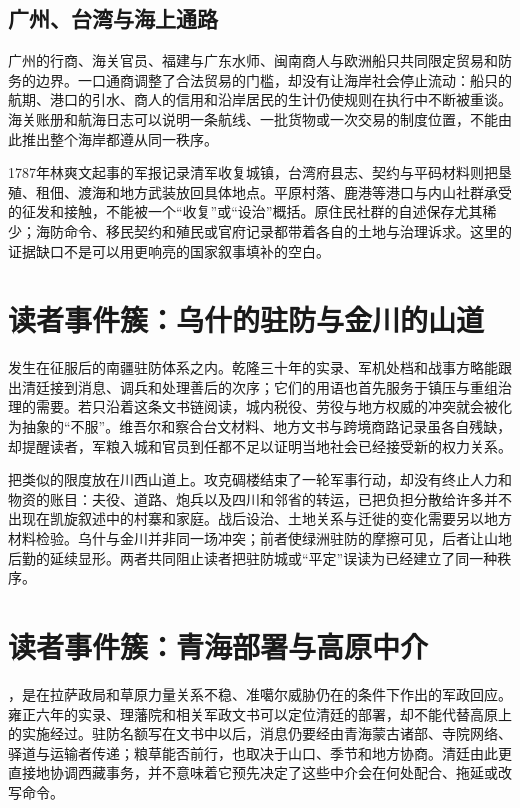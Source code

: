 \subsection{广州、台湾与海上通路}

广州的行商、海关官员、福建与广东水师、闽南商人与欧洲船只共同限定贸易和防务的边界。一口通商调整了合法贸易的门槛，却没有让海岸社会停止流动：船只的航期、港口的引水、商人的信用和沿岸居民的生计仍使规则在执行中不断被重谈。海关账册和航海日志可以说明一条航线、一批货物或一次交易的制度位置，不能由此推出整个海岸都遵从同一秩序。

1787年林爽文起事的军报记录清军收复城镇，台湾府县志、契约与平码材料则把垦殖、租佃、渡海和地方武装放回具体地点。平原村落、鹿港等港口与内山社群承受的征发和接触，不能被一个“收复”或“设治”概括。原住民社群的自述保存尤其稀少；海防命令、移民契约和殖民或官府记录都带着各自的土地与治理诉求。这里的证据缺口不是可以用更响亮的国家叙事填补的空白。

\section{读者事件簇：乌什的驻防与金川的山道}

发生在征服后的南疆驻防体系之内。乾隆三十年的实录、军机处档和战事方略能跟出清廷接到消息、调兵和处理善后的次序；它们的用语也首先服务于镇压与重组治理的需要。若只沿着这条文书链阅读，城内税役、劳役与地方权威的冲突就会被化为抽象的“不服”。维吾尔和察合台文材料、地方文书与跨境商路记录虽各自残缺，却提醒读者，军粮入城和官员到任都不足以证明当地社会已经接受新的权力关系。

把类似的限度放在川西山道上。攻克碉楼结束了一轮军事行动，却没有终止人力和物资的账目：夫役、道路、炮兵以及四川和邻省的转运，已把负担分散给许多并不出现在凯旋叙述中的村寨和家庭。战后设治、土地关系与迁徙的变化需要另以地方材料检验。乌什与金川并非同一场冲突；前者使绿洲驻防的摩擦可见，后者让山地后勤的延续显形。两者共同阻止读者把驻防城或“平定”误读为已经建立了同一种秩序。

\section{读者事件簇：青海部署与高原中介}

，是在拉萨政局和草原力量关系不稳、准噶尔威胁仍在的条件下作出的军政回应。雍正六年的实录、理藩院和相关军政文书可以定位清廷的部署，却不能代替高原上的实施经过。驻防名额写在文书中以后，消息仍要经由青海蒙古诸部、寺院网络、驿道与运输者传递；粮草能否前行，也取决于山口、季节和地方协商。清廷由此更直接地协调西藏事务，并不意味着它预先决定了这些中介会在何处配合、拖延或改写命令。

